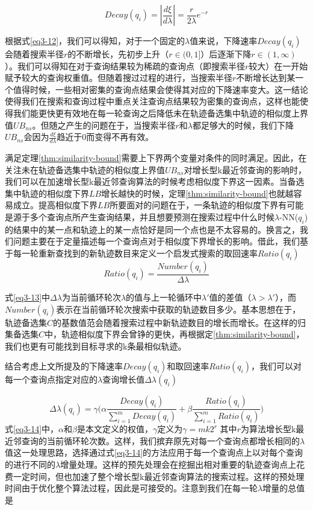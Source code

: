 \begin{equation}
\label{eq3-12}
Decay(q_i) = |\frac{d\xi}{d\lambda}| = \frac{r}{2\lambda}e^{-r} 
\end{equation}

根据式\ref{eq3-12}，我们可以得知，对于一个固定的$\lambda$值来说，下降速率$Decay(q_i)$会随着搜索半径$r$的不断增长，先初步上升（$r\in(0,1]$）后逐渐下降$r\in(1,\infty)$）。我们可以得知在对于查询结果较为稀疏的查询点（即搜索半径$r$较大）在一开始赋予较大的查询权重值。但随着搜过过程的进行，当搜索半径$r$不断增长达到某一个值得时候，一些相对密集的查询点结果会使得其对应的下降速率变大。这一结论使得我们在搜索和查询过程中重点关注查询点结果较为密集的查询点，这样也能使得我们能更快更有效地在每一轮查询之后降低未在轨迹备选集中轨迹的相似度上界值$UB_{ns}$。但随之产生的问题在于，当搜索半径$r$和$\lambda$都足够大的时候，我们下降$UB_{ns}$会因为$\frac{d\xi}{d\lambda}$趋近于0而变得不再有效。

满足定理\ref{thm:similarity-bound}需要上下界两个变量对条件的同时满足。因此，在关注未在轨迹备选集中轨迹的相似度上界值$UB_{ns}$对增长型k最近邻查询的影响时，我们可以在加速增长型k最近邻查询算法的时候考虑相似度下界这一因素。当备选集中轨迹的相似度下界$LB$增长越快的时候，定理\ref{thm:similarity-bound}也就越容易成立。提高相似度下界$LB$所要面对的问题在于，一条轨迹的相似度下界有可能是源于多个查询点所产生查询结果，并且想要预测在搜索过程中什么时候$\lambda$-NN($q_i$)的结果中的某一点和轨迹上的某一点恰好是同一个点也是不太容易的。换言之，我们问题主要在于定量描述每一个查询点对于相似度下界增长的影响。借此，我们基于每一轮重新查找到的新轨迹数目来定义一个启发式搜索的取回速率$Ratio(q_i)$
\begin{equation}
\label{eq3-13}
Ratio(q_i) = \frac{Number(q_i)}{\Delta\lambda}
\end{equation}

式\ref{eq3-13}中$\Delta\lambda$为当前循环轮次$\lambda$的值与上一轮循环中$\lambda'$值的差值（$\lambda > \lambda'$），而$Number(q_i)$表示在当前循环轮次搜索中获取的轨迹数目多少。基本思想在于，轨迹备选集$C$的基数值范会随着搜索过程中新轨迹数目的增长而增长。在这样的归集备选集$C$中，轨迹相似度下界会曾铮的更快，再根据定\ref{thm:similarity-bound}，我们也更有可能找到目标寻求的k条最相似轨迹。

结合考虑上文所提及的下降速率$Decay(q_i)$和取回速率$Ratio(q_i)$，我们可以对每一个查询点指定对应的$\lambda$查询增长值$\Delta\lambda(q_i)$

\begin{equation}
\label{eq3-14}
\Delta\lambda(q_i) = \gamma\big( \alpha\frac{Decay(q_i)}{\sum_{i=1}^{m}Decay(q_i)} + \beta\frac{Ratio(q_i)}{\sum_{i=1}^{m}Ratio(q_i)} \big)
\end{equation}
式\ref{eq3-14}中，$\alpha$和$\beta$是本文定义的权值，$\gamma$定义为$\gamma = mk2^{r}$ 其中$r$为算法增长型k最近邻查询的当前循环轮次数。这样，我们摈弃原先对每一个查询点都增长相同的$\lambda$值这一处理思路，选择通过式\ref{eq3-14}的方法应用于每一个查询点上以对每个查询的进行不同的$\lambda$增量处理。这样的预先处理会在挖掘出相对重要的轨迹查询点上花费一定时间，但也加速了整个增长型k最近邻查询算法的搜索过程。这样的预处理时间由于优化整个算法过程，因此是可接受的。注意到我们在每一轮$\lambda$增量的总值是

